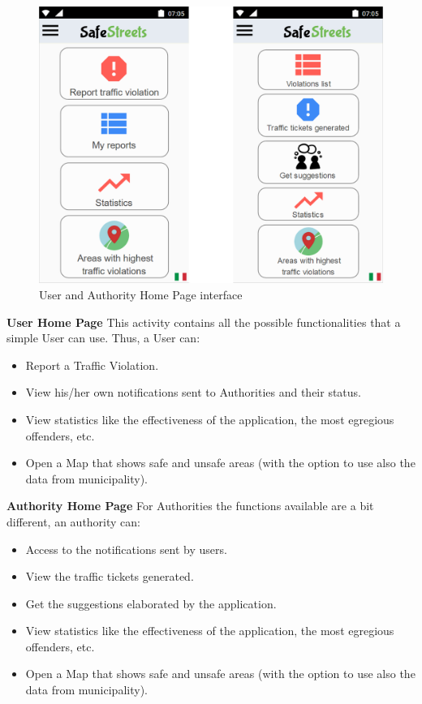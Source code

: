     \\\\
        \begin{figure}[h]
    \centering
    \includegraphics[scale=0.56]{Images/user_authority_menu.png}
    \caption{User and Authority Home Page interface}
    \end{figure}
    \newline
    \textbf{User Home Page}\newline
    This activity contains all the possible functionalities that a simple User can use. Thus, a User can:
    \begin{itemize}
        \item Report a Traffic Violation.
        \item View his/her own notifications sent to Authorities and their status.
        \item View statistics like the effectiveness of the application, the most egregious offenders, etc.
        \item Open a Map that shows safe and unsafe areas (with the option to use also the data from municipality).
    \end{itemize}
    \textbf{Authority Home Page}\newline
    For Authorities the functions available are a bit different, an authority can:
    \begin{itemize}
        \item Access to the notifications sent by users.
        \item View the traffic tickets generated.
        \item Get the suggestions elaborated by the application.
        \item View statistics like the effectiveness of the application, the most egregious offenders, etc.
        \item Open a Map that shows safe and unsafe areas (with the option to use also the data from municipality).
    \end{itemize}
